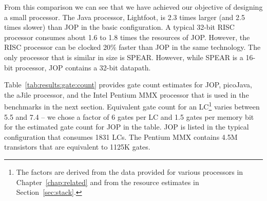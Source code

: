 From this comparison we can see that we have achieved our objective
of designing a small processor. The Java processor, Lightfoot, is
2.3 times larger (and 2.5 times slower) than JOP in the basic
configuration. A typical 32-bit RISC processor consumes about 1.6 to
1.8 times the resources of JOP. However, the RISC processor can be
clocked 20\% faster than JOP in the same technology. The only
processor that is similar in size is SPEAR. However, while SPEAR is
a 16-bit processor, JOP contains a 32-bit datapath.


%

Table~\ref{tab:results:gate:count} provides gate count estimates for
JOP, picoJava, the aJile processor, and the Intel Pentium MMX
processor that is used in the benchmarks in the next section.
Equivalent gate count for an LC\footnote{The factors are derived
from the data provided for various processors in
Chapter~\ref{chap:related} and from the resource estimates in
Section~\ref{sec:stack}.} varies between 5.5 and 7.4 -- we chose a
factor of 6 gates per LC and 1.5 gates per memory bit for the
estimated gate count for JOP in the table. JOP is listed in the
typical configuration that consumes 1831 LCs. The Pentium MMX
contains 4.5M transistors \cite{pentium:mmx} that are equivalent to
1125K gates.

